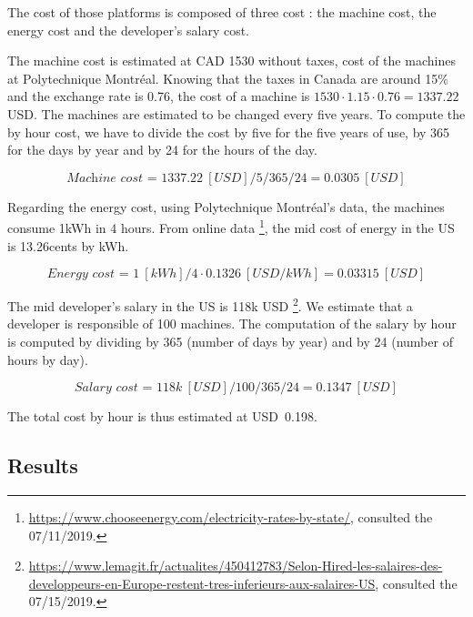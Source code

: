 
The cost of those platforms is composed of three cost : the machine cost, the energy cost and the developer's salary cost. 

The machine cost is estimated at CAD 1530 without taxes, cost of the machines at Polytechnique Montréal. Knowing that the taxes in Canada are around 15\% and the exchange rate is 0.76, the cost of a machine is $1530 \cdot 1.15 \cdot 0.76=1337.22$ USD. The machines are estimated to be changed every five years. To compute the by hour cost,  we have to divide the cost by five for the five years of use, by 365 for the days by year and by 24 for the hours of the day. 

$$\textit{Machine cost = } 1337.22~[USD] / 5 / 365 / 24 = 0.0305~[USD]$$

Regarding the energy cost, using Polytechnique Montréal's data, the machines consume 1kWh in 4 hours. From online data \footnote{\url{https://www.chooseenergy.com/electricity-rates-by-state/}, consulted the 07/11/2019.}, the mid cost of energy in the US is 13.26cents by kWh.

$$\textit{Energy cost = } 1~[kWh] / 4 \cdot 0.1326~[USD/kWh] = 0.03315~[USD]$$

The mid developer's salary in the US is 118k USD \footnote{\href{https://www.lemagit.fr/actualites/450412783/Selon-Hired-les-salaires-des-developpeurs-en-Europe-restent-tres-inferieurs-aux-salaires-US}{https://www.lemagit.fr/actualites/450412783/Selon-Hired-les-salaires-des-developpeurs-en-Europe-restent-tres-inferieurs-aux-salaires-US}, consulted the 07/15/2019.}. We estimate that a developer is responsible of 100 machines. The computation of the salary by hour is computed by dividing by 365 (number of days by year) and by 24 (number of hours by day).

$$ \textit{Salary cost = }118k~[USD] / 100 / 365 / 24 = 0.1347~[USD] $$ 

The total cost by hour is thus estimated at USD~0.198.

\subsection{Results}

